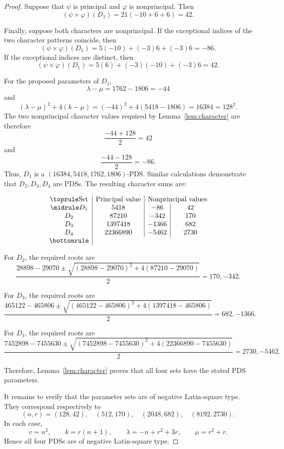 \documentclass[11pt]{article}
\theoremstyle{definition}
\theoremstyle{remark}
\begin{document}
\begin{proof}
Suppose that \(\psi\) is principal and \(\varphi\) is nonprincipal.
Then
\[
(\psi\times\varphi)(D_1)
=
21(-10+6+6)
=
42.
\]

Finally, suppose both characters are nonprincipal. If the exceptional
indices of the two character patterns coincide, then
\[
(\psi\times\varphi)(D_1)
=
5(-10)+(-3)6+(-3)6
=
-86.
\]
If the exceptional indices are distinct, then
\[
(\psi\times\varphi)(D_1)
=
5(6)+(-3)(-10)+(-3)6
=
42.
\]

For the proposed parameters of \(D_1\),
\[
\lambda-\mu
=
1762-1806
=
-44
\]
and
\[
(\lambda-\mu)^2+4(k-\mu)
=
(-44)^2+4(5418-1806)
=
16384
=
128^2.
\]
The two nonprincipal character values required by
Lemma~\ref{lem:character} are therefore
\[
\frac{-44+128}{2}=42
\]
and
\[
\frac{-44-128}{2}=-86.
\]
Thus, \(D_1\) is a $(16384,5418,1762,1806)\text{-PDS}.$ Similar calculations demonstrate that  \(D_2,D_3,D_4\) are PDSs. The resulting
character sums are:

\[
\begin{array}{c|c|c|c}
\toprule
\text{Set}
&
\text{Principal value}
&
\multicolumn{2}{c}{\text{Nonprincipal values}}
\\
\midrule
D_1 & 5418     & -86   & 42   \\
D_2 & 87210    & -342  & 170  \\
D_3 & 1397418  & -1366 & 682  \\
D_4 & 22366890 & -5462 & 2730 \\
\bottomrule
\end{array}
\]

For \(D_2\), the required roots are
\[
\frac{28898-29070
\pm
\sqrt{(28898-29070)^2+4(87210-29070)}}{2}
=
170,-342.
\]

For \(D_3\), the required roots are
\[
\frac{465122-465806
\pm
\sqrt{(465122-465806)^2+
4(1397418-465806)}}{2}
=
682,-1366.
\]

For \(D_4\), the required roots are
\[
\frac{7452898-7455630
\pm
\sqrt{(7452898-7455630)^2+
4(22366890-7455630)}}{2}
=
2730,-5462.
\]

Therefore, Lemma~\ref{lem:character} proves that all four sets have
the stated PDS parameters.

It remains to verify that the parameter sets are of negative
Latin-square type. They correspond respectively to
\[
(n,r)=(128,42),\quad
(512,170),\quad
(2048,682),\quad
(8192,2730).
\]
In each case,
\[
v=n^2,\qquad
k=r(n+1),\qquad
\lambda=-n+r^2+3r,\qquad
\mu=r^2+r.
\]
Hence all four PDSs are of negative Latin-square type.
\end{proof}
\end{document}

